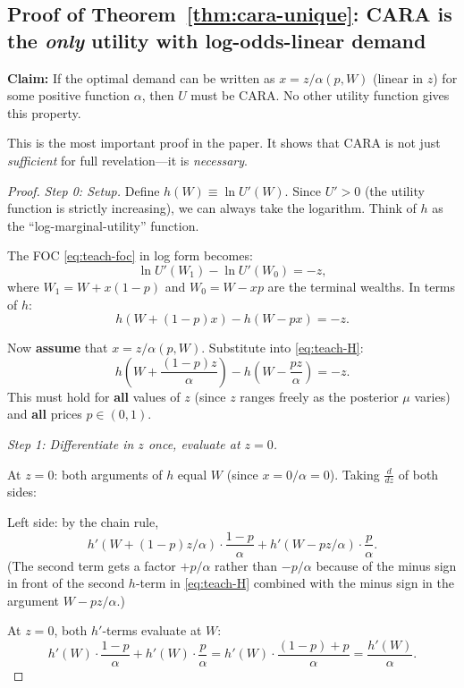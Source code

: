 \documentclass[12pt,letterpaper]{article}
\theoremstyle{definition}
\theoremstyle{remark}
\newcommand{\1}{\mathbf{1}}
\begin{document}
\subsection*{Proof of Theorem~\ref{thm:cara-unique}: CARA is the
\emph{only} utility with log-odds-linear demand}

\textbf{Claim:} If the optimal demand can be written as
$x = z/\alpha(p,W)$ (linear in $z$) for some positive function $\alpha$,
then $U$ must be CARA. No other utility function gives this property.

This is the most important proof in the paper. It shows that CARA is
not just \emph{sufficient} for full revelation---it is \emph{necessary}.

\begin{proof}
\emph{Step 0: Setup.}
Define $h(W) \equiv \ln U'(W)$. Since $U' > 0$ (the utility function
is strictly increasing), we can always take the logarithm. Think of $h$
as the ``log-marginal-utility'' function.

The FOC \eqref{eq:teach-foc} in log form becomes:
\[
   \ln U'(W_1) - \ln U'(W_0) = -z,
\]
where $W_1 = W + x(1-p)$ and $W_0 = W - xp$ are the terminal wealths.
In terms of $h$:
\begin{equation}
   h(W + (1-p)x) - h(W - px) = -z.
\tag{H}
\label{eq:teach-H}
\end{equation}

Now \textbf{assume} that $x = z/\alpha(p,W)$. Substitute into
\eqref{eq:teach-H}:
\[
   h\!\left(W + \frac{(1-p)z}{\alpha}\right)
   - h\!\left(W - \frac{pz}{\alpha}\right) = -z.
\]
This must hold for \textbf{all} values of $z$ (since $z$ ranges freely
as the posterior $\mu$ varies) and \textbf{all} prices $p \in (0,1)$.

\emph{Step 1: Differentiate in $z$ once, evaluate at $z = 0$.}

At $z = 0$: both arguments of $h$ equal $W$ (since $x = 0/\alpha = 0$).
Taking $\frac{d}{dz}$ of both sides:

Left side: by the chain rule,
\[
   h'(W + (1-p)z/\alpha) \cdot \frac{1-p}{\alpha}
   + h'(W - pz/\alpha) \cdot \frac{p}{\alpha}.
\]
(The second term gets a factor $+p/\alpha$ rather than $-p/\alpha$
because of the minus sign in front of the second $h$-term in
\eqref{eq:teach-H} combined with the minus sign in the argument
$W - pz/\alpha$.)

At $z = 0$, both $h'$-terms evaluate at $W$:
\[
   h'(W) \cdot \frac{1-p}{\alpha} + h'(W) \cdot \frac{p}{\alpha}
   = h'(W) \cdot \frac{(1-p) + p}{\alpha}
   = \frac{h'(W)}{\alpha}.
\]


\end{proof}
\end{document}
